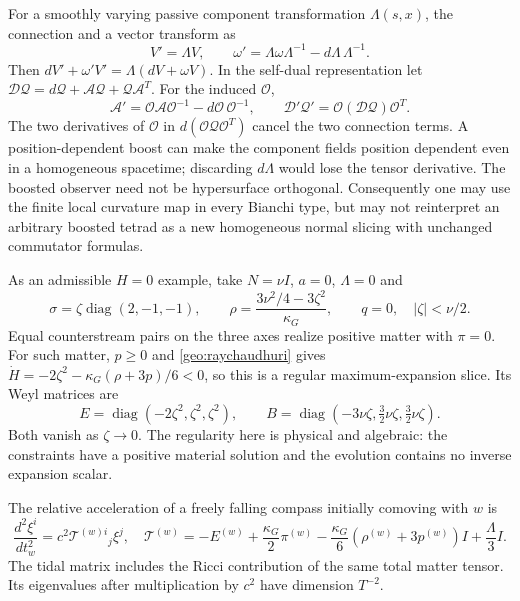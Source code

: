 For a smoothly varying passive component transformation $\Lambda(s,x)$, the connection and a vector transform as
\begin{equation}
 V'=\Lambda V,\qquad
 \omega'=\Lambda\omega\Lambda^{-1}-d\Lambda\,\Lambda^{-1}.
 \label{geo:local_connection}
\end{equation}
Then $dV'+\omega'V'=\Lambda(dV+\omega V)$. In the self-dual representation let
$\mathcal D\mathcal Q=d\mathcal Q+\mathcal A\mathcal Q+\mathcal Q\mathcal A^T$.
For the induced $\mathcal O$,
\begin{equation}
 \mathcal A'=\mathcal O\mathcal A\mathcal O^{-1}
                   -d\mathcal O\,\mathcal O^{-1},\qquad
 \mathcal D'\mathcal Q'=\mathcal O(\mathcal D\mathcal Q)\mathcal O^T.
 \label{geo:selfdual_connection}
\end{equation}
The two derivatives of $\mathcal O$ in $d(\mathcal O\mathcal Q\mathcal O^T)$ cancel the two connection terms. A position-dependent boost can make the component fields position dependent even in a homogeneous spacetime; discarding $d\Lambda$ would lose the tensor derivative. The boosted observer need not be hypersurface orthogonal. Consequently one may use the finite local curvature map in every Bianchi type, but may not reinterpret an arbitrary boosted tetrad as a new homogeneous normal slicing with unchanged commutator formulas.

As an admissible $H=0$ example, take $N=\nu I$, $a=0$, $\Lambda=0$ and
\begin{equation}
 \sigma=\zeta\operatorname{diag}(2,-1,-1),\qquad
 \rho=\frac{3\nu^2/4-3\zeta^2}{\kappa_G},\qquad
 q=0,\quad |\zeta|<\nu/2.
 \label{geo:IX_data}
\end{equation}
Equal counterstream pairs on the three axes realize positive matter with $\pi=0$. For such matter, $p\ge0$ and \eqref{geo:raychaudhuri} gives
$\dot H=-2\zeta^2-\kappa_G(\rho+3p)/6<0$, so this is a regular maximum-expansion slice. Its Weyl matrices are
\begin{equation}
 E=\operatorname{diag}(-2\zeta^2,\zeta^2,\zeta^2),\qquad
 B=\operatorname{diag}(-3\nu\zeta,\tfrac32\nu\zeta,\tfrac32\nu\zeta).
 \label{geo:IX_weyl}
\end{equation}
Both vanish as $\zeta\to0$. The regularity here is physical and algebraic: the constraints have a positive material solution and the evolution contains no inverse expansion scalar.

The relative acceleration of a freely falling compass initially comoving with $w$ is
\begin{equation}
 \frac{d^2\xi^i}{dt_w^2}=c^2\mathcal T^{(w)i}{}_j\xi^j,\quad
 \mathcal T^{(w)}=-E^{(w)}+\frac{\kappa_G}{2}\pi^{(w)}
 -\frac{\kappa_G}{6}(\rho^{(w)}+3p^{(w)})I+\frac\Lambda3I.
 \label{geo:tidal}
\end{equation}
The tidal matrix includes the Ricci contribution of the same total matter tensor. Its eigenvalues after multiplication by $c^2$ have dimension $T^{-2}$.



